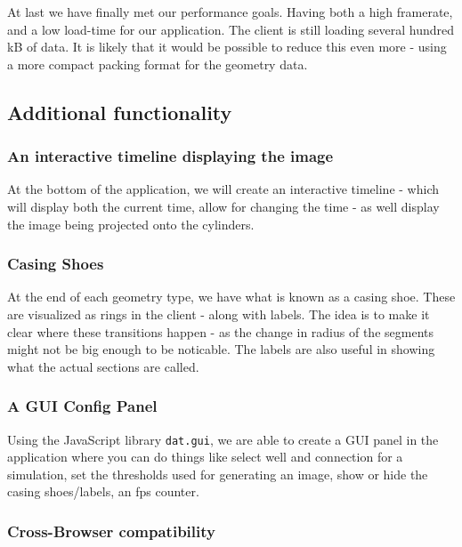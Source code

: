 At last we have finally met our performance goals. Having both a high
framerate, and a low load-time for our application. The client is still
loading several hundred kB of data. It is likely that it would be
possible to reduce this even more - using a more compact packing format
for the geometry data.

\hypertarget{additional-functionality}{%
\subsection{Additional functionality}\label{additional-functionality}}

\hypertarget{an-interactive-timeline-displaying-the-image}{%
\subsubsection{An interactive timeline displaying the
image}\label{an-interactive-timeline-displaying-the-image}}

At the bottom of the application, we will create an interactive timeline
- which will display both the current time, allow for changing the time
- as well display the image being projected onto the cylinders.

\hypertarget{casing-shoes}{%
\subsubsection{Casing Shoes}\label{casing-shoes}}

At the end of each geometry type, we have what is known as a casing
shoe. These are visualized as rings in the client - along with labels.
The idea is to make it clear where these transitions happen - as the
change in radius of the segments might not be big enough to be
noticable. The labels are also useful in showing what the actual
sections are called.

\hypertarget{a-gui-config-panel}{%
\subsubsection{A GUI Config Panel}\label{a-gui-config-panel}}

Using the JavaScript library \texttt{dat.gui}, we are able to create a
GUI panel in the application where you can do things like select well
and connection for a simulation, set the thresholds used for generating
an image, show or hide the casing shoes/labels, an fps counter.

\hypertarget{cross-browser-compatibility}{%
\subsubsection{Cross-Browser
compatibility}\label{cross-browser-compatibility}}

